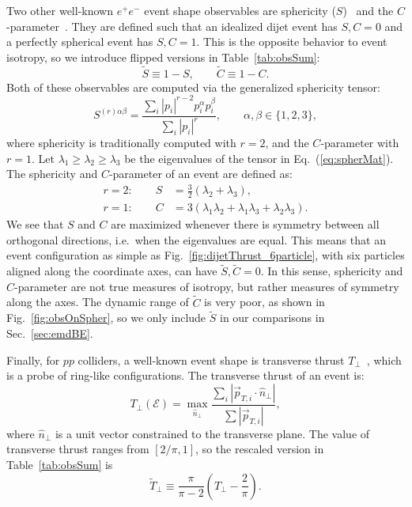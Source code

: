 \documentclass[letterpaper,11pt]{article}
\DeclareRobustCommand{\Sec}[1]{Sec.~\ref{#1}}
\DeclareRobustCommand{\Tab}[1]{Table~\ref{#1}}
\DeclareRobustCommand{\Fig}[1]{Fig.~\ref{#1}}
\DeclareRobustCommand{\Eq}[1]{Eq.~(\ref{#1})}
\begin{document}
Two other well-known $e^+e^-$ event shape observables are sphericity ($S$)~\cite{Bjorken:1969wi,Ellis:1976uc} and the $C$-parameter~\cite{Parisi:1978eg,Donoghue:1979vi,Ellis:1980wv}.
%
They are defined such that an idealized dijet event has $S, C = 0$ and a perfectly spherical event has $S, C = 1$.  This is the opposite behavior to event isotropy, so we introduce flipped versions in \Tab{tab:obsSum}:
%
\begin{equation}
\widetilde{S} \equiv 1 - S, \qquad \widetilde{C} \equiv 1 - C.
\end{equation}
%
Both of these observables are computed via the generalized sphericity tensor:
%
\begin{equation}
S^{(r) \alpha \beta} = \frac{\sum_i |p_i|^{r-2}p_i^\alpha p_i^\beta }{\sum_i |p_i|^r}, \qquad \alpha, \beta \in \{1,2,3\},
\label{eq:spherMat}
\end{equation}
%
where sphericity is traditionally computed with $r=2$, and the $C$-parameter with $r=1$. 
%
Let $\lambda_1 \geq \lambda_2 \geq \lambda_3$ be the eigenvalues of the tensor in \Eq{eq:spherMat}. 
%
The sphericity and $C$-parameter of an event are defined as:
%
\begin{align}
r=2: \qquad S &= \frac{3}{2}\left( \lambda_2 + \lambda_3 \right), \nonumber \\
r=1: \qquad C &= 3 \left(\lambda_1 \lambda_2 + \lambda_1 \lambda_3 + \lambda_2 \lambda_3 \right).
\label{eq:sandc}
\end{align}
%
We see that $S$ and $C$ are maximized whenever there is symmetry between all orthogonal directions, i.e.\ when the eigenvalues are equal. 
%
This means that an event configuration as simple as \Fig{fig:dijetThrust_6particle}, with six particles aligned along the coordinate axes, can have $\widetilde{S}, \widetilde{C} = 0$. 
%
In this sense, sphericity and $C$-parameter are not true measures of isotropy, but rather measures of symmetry along the axes. 
%
The dynamic range of $\widetilde{C}$ is very poor, as shown in \Fig{fig:obsOnSpher}, so we only include $\widetilde{S}$ in our comparisons in \Sec{sec:emdBE}.


Finally, for $pp$ colliders, a well-known event shape is transverse thrust $T_\perp$~\cite{Bertram:2002sv,Nagy:2003tz,Banfi:2004nk,Banfi:2010xy}, which is a probe of ring-like configurations.
%
The transverse thrust of an event is:
%
\begin{equation}
\label{eq:transthrust_def}
T_\perp(\mathcal{E}) = \max_{\hat{n}_\perp} \frac{\sum_i | \vec{p}_{T,i} \cdot \hat{n}_\perp | }{\sum |\vec{p}_{T,i}|},
\end{equation}
%
where $\hat{n}_\perp$ is a unit vector constrained to the transverse plane. 
%
The value of transverse thrust ranges from $[2/\pi, 1]$, so the rescaled version in \Tab{tab:obsSum} is
%
\begin{equation}
\widetilde{T}_\perp \equiv \frac{\pi}{\pi-2}\left( T_\perp - \frac{2}{\pi}\right). 
\end{equation}
\end{document}
